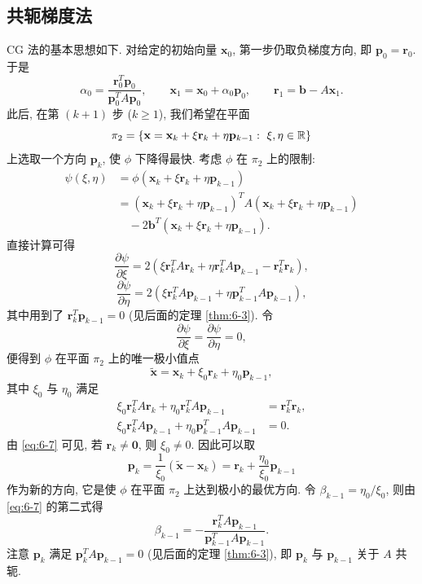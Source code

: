 \subsection{共轭梯度法}
\label{subsec:6-2-1}

CG 法的基本思想如下. 对给定的初始向量 $\mathbf{x}_0$, 第一步仍取负梯度方向, 即 $\mathbf{p}_0=\mathbf{r}_0$. 于是
\[
  \alpha_0=\frac{\mathbf{r}_0^T\mathbf{p}_0}{\mathbf{p}_0^TA\mathbf{p}_0},
  \qquad
  \mathbf{x}_1=\mathbf{x}_0+\alpha_0\mathbf{p}_0,
  \qquad
  \mathbf{r}_1=\mathbf{b}-A\mathbf{x}_1.
\]
此后, 在第 $(k+1)$ 步 ($k\geqslant1$), 我们希望在平面
\[
  \pi_2=\left\{\mathbf{x}=\mathbf{x}_k+\xi\mathbf{r}_k+\eta\mathbf{p}_{k-1}:
  \ \xi,\eta\in\mathbb{R}\right\}
\]
上选取一个方向 $\mathbf{p}_k$, 使 $\phi$ 下降得最快. 考虑 $\phi$ 在 $\pi_2$ 上的限制:
\[
  \begin{aligned}
    \psi(\xi,\eta)&=\phi(\mathbf{x}_k+\xi\mathbf{r}_k+\eta\mathbf{p}_{k-1})\\
    &=(\mathbf{x}_k+\xi\mathbf{r}_k+\eta\mathbf{p}_{k-1})^T
      A(\mathbf{x}_k+\xi\mathbf{r}_k+\eta\mathbf{p}_{k-1})\\
    &\quad-2\mathbf{b}^T(\mathbf{x}_k+\xi\mathbf{r}_k+\eta\mathbf{p}_{k-1}).
  \end{aligned}
\]
直接计算可得
\[
  \frac{\partial\psi}{\partial\xi}
  =2\left(\xi\mathbf{r}_k^TA\mathbf{r}_k+\eta\mathbf{r}_k^TA\mathbf{p}_{k-1}
  -\mathbf{r}_k^T\mathbf{r}_k\right),
\]
\[
  \frac{\partial\psi}{\partial\eta}
  =2\left(\xi\mathbf{r}_k^TA\mathbf{p}_{k-1}
  +\eta\mathbf{p}_{k-1}^TA\mathbf{p}_{k-1}\right),
\]
其中用到了 $\mathbf{r}_k^T\mathbf{p}_{k-1}=0$ (见后面的定理 \ref{thm:6-3}). 令
\[
  \frac{\partial\psi}{\partial\xi}=\frac{\partial\psi}{\partial\eta}=0,
\]
便得到 $\phi$ 在平面 $\pi_2$ 上的唯一极小值点
\[
  \tilde{\mathbf{x}}=\mathbf{x}_k+\xi_0\mathbf{r}_k+\eta_0\mathbf{p}_{k-1},
\]
其中 $\xi_0$ 与 $\eta_0$ 满足
\begin{equation}
  \begin{aligned}
    \xi_0\mathbf{r}_k^TA\mathbf{r}_k+\eta_0\mathbf{r}_k^TA\mathbf{p}_{k-1}
    &=\mathbf{r}_k^T\mathbf{r}_k,\\
    \xi_0\mathbf{r}_k^TA\mathbf{p}_{k-1}
    +\eta_0\mathbf{p}_{k-1}^TA\mathbf{p}_{k-1}&=0.
  \end{aligned}
  \label{eq:6-7}
\end{equation}
由 \eqref{eq:6-7} 可见, 若 $\mathbf{r}_k\neq\mathbf{0}$, 则 $\xi_0\neq0$. 因此可以取
\[
  \mathbf{p}_k=\frac{1}{\xi_0}(\tilde{\mathbf{x}}-\mathbf{x}_k)
  =\mathbf{r}_k+\frac{\eta_0}{\xi_0}\mathbf{p}_{k-1}
\]
作为新的方向, 它是使 $\phi$ 在平面 $\pi_2$ 上达到极小的最优方向. 令 $\beta_{k-1}=\eta_0/\xi_0$, 则由 \eqref{eq:6-7} 的第二式得
\[
  \beta_{k-1}=-\frac{\mathbf{r}_k^TA\mathbf{p}_{k-1}}
  {\mathbf{p}_{k-1}^TA\mathbf{p}_{k-1}}.
\]
注意 $\mathbf{p}_k$ 满足 $\mathbf{p}_k^TA\mathbf{p}_{k-1}=0$ (见后面的定理 \ref{thm:6-3}), 即 $\mathbf{p}_k$ 与 $\mathbf{p}_{k-1}$ 关于 $A$ 共轭.


